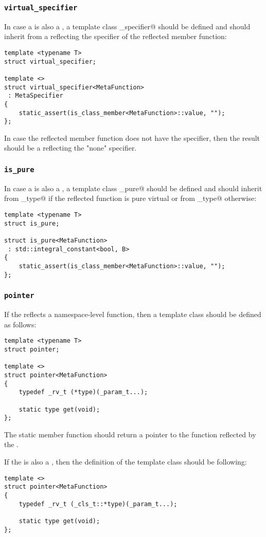 \subsubsection{\texttt{virtual\_specifier}}

In case a  is also a ,
a template class \verb@virtual_specifier@ should be defined and should inherit from
a  reflecting the \verb@virtual@ specifier of the reflected member function:

\begin{verbatim}
template <typename T>
struct virtual_specifier;

template <>
struct virtual_specifier<MetaFunction>
 : MetaSpecifier
{
	static_assert(is_class_member<MetaFunction>::value, "");
};
\end{verbatim}

In case the reflected member function does not have the \verb@virtual@ specifier,
then the result should be a  reflecting the "none" specifier.

\subsubsection{\texttt{is\_pure}}

In case a  is also a ,
a template class \verb@is_pure@ should be defined and should inherit from
\verb@true_type@ if the reflected function is pure virtual or from \verb@false_type@
otherwise:

\begin{verbatim}
template <typename T>
struct is_pure;

struct is_pure<MetaFunction>
 : std::integral_constant<bool, B>
{
	static_assert(is_class_member<MetaFunction>::value, "");
};
\end{verbatim}

\subsubsection{\texttt{pointer}}

If the  reflects a namespace-level function, then
a template class \verb@pointer@ should be defined as follows:

\begin{verbatim}
template <typename T>
struct pointer;

template <>
struct pointer<MetaFunction>
{
	typedef _rv_t (*type)(_param_t...);

	static type get(void);
};
\end{verbatim}

The \verb@get@ static member function should return a pointer to the function
reflected by the .

If the  is also a , then the definition of the
\verb@pointer@ template class should be following:

\begin{verbatim}
template <>
struct pointer<MetaFunction>
{
	typedef _rv_t (_cls_t::*type)(_param_t...);

	static type get(void);
};
\end{verbatim}

